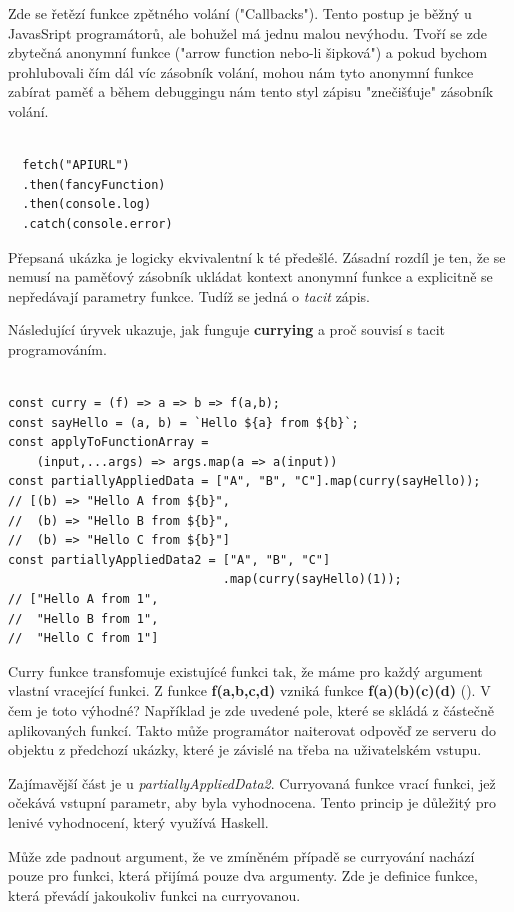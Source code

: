 \documentclass[male,czech]{kithesis}
\begin{document}
Zde se řetězí funkce zpětného volání ("Callbacks"). 
Tento postup je běžný u JavasSript programátorů,
ale bohužel má jednu malou nevýhodu.
Tvoří se zde zbytečná anonymní funkce ("arrow function nebo-li šipková") 
a pokud bychom prohlubovali čím dál víc zásobník volání,
mohou nám tyto anonymní funkce zabírat paměť a 
během debuggingu nám tento styl zápisu "znečišťuje" 
zásobník volání. 

\begin{verbatim}

  fetch("APIURL")
  .then(fancyFunction)
  .then(console.log)
  .catch(console.error)

\end{verbatim}

Přepsaná ukázka je logicky ekvivalentní k té předešlé. 
Zásadní rozdíl je ten, 
že se nemusí na paměťový zásobník ukládat kontext anonymní funkce 
a explicitně se nepředávají parametry funkce. 
Tudíž se jedná o \textit{tacit} zápis.

Následující úryvek ukazuje, 
jak funguje \textbf{currying} a proč souvisí s tacit programováním.
\begin{verbatim}

const curry = (f) => a => b => f(a,b);
const sayHello = (a, b) = `Hello ${a} from ${b}`;
const applyToFunctionArray = 
    (input,...args) => args.map(a => a(input))
const partiallyAppliedData = ["A", "B", "C"].map(curry(sayHello)); 
// [(b) => "Hello A from ${b}", 
//  (b) => "Hello B from ${b}", 
//  (b) => "Hello C from ${b}"]
const partiallyAppliedData2 = ["A", "B", "C"]
                              .map(curry(sayHello)(1)); 
// ["Hello A from 1", 
//  "Hello B from 1", 
//  "Hello C from 1"]

\end{verbatim}
Curry funkce transfomuje existujícé funkci tak, 
že máme pro každý argument vlastní vracející funkci. 
Z funkce \textbf{f(a,b,c,d)} vzniká funkce \textbf{f(a)(b)(c)(d)} (\cite{Currying}).
V čem je toto výhodné?
Například je zde uvedené pole, 
které se skládá z částečně aplikovaných funkcí. 
Takto může programátor naiterovat odpověď ze serveru do objektu z předchozí ukázky,
které je závislé na třeba na uživatelském vstupu. 

Zajímavější část je u \textit{partiallyAppliedData2}. 
Curryovaná funkce vrací funkci, 
jež očekává vstupní parametr, 
aby byla vyhodnocena. 
Tento princip je důležitý
pro lenivé vyhodnocení, 
který využívá Haskell.

Může zde padnout argument, 
že ve zmíněném případě se curryování nachází pouze pro funkci,
která přijímá pouze dva argumenty. 
Zde je definice funkce, 
která převádí jakoukoliv funkci na curryovanou.
\end{document}
